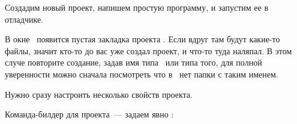 \label{labecreprj}

Создадим новый проект, напишем простую программу, и запустим ее в отладчике.

\bigskip{}






 \bigskip В окне \eclpx\ появится пустая закладка
 проекта . Если вдруг там будут какие-то файлы, значит кто-то до вас уже
 создал проект, и что-то туда наляпал. В этом случе повторите создание, задав
 имя типа \ или типа того, для полной
 уверенности можно сначала посмотреть что в \ нет папки с таким именем.

\bigskip Нужно сразу настроить несколько свойств проекта.

\bigskip Команда-билдер для проекта\ --- задаем явно :

\bigskip{}





